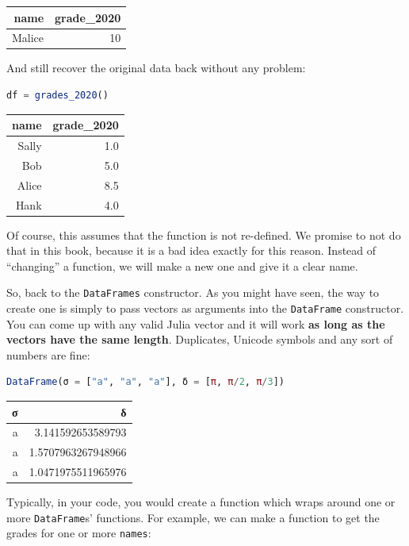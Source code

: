\documentclass[
  notoc %
]{tufte-book}
\newcommand{\passthrough}[1]{#1}
\begin{document}
\begin{longtable}[]{@{}rr@{}}
\toprule()
name & grade\_2020 \\
\midrule()
\endhead
Malice & 10 \\
\bottomrule()
\end{longtable}

And still recover the original data back without any problem:

\begin{lstlisting}[language=Julia]
df = grades_2020()
\end{lstlisting}

\begin{longtable}[]{@{}rr@{}}
\toprule()
name & grade\_2020 \\
\midrule()
\endhead
Sally & 1.0 \\
Bob & 5.0 \\
Alice & 8.5 \\
Hank & 4.0 \\
\bottomrule()
\end{longtable}

Of course, this assumes that the function is not re-defined. We promise
to not do that in this book, because it is a bad idea exactly for this
reason. Instead of ``changing'' a function, we will make a new one and
give it a clear name.

So, back to the \passthrough{\lstinline!DataFrames!} constructor. As you
might have seen, the way to create one is simply to pass vectors as
arguments into the \passthrough{\lstinline!DataFrame!} constructor. You
can come up with any valid Julia vector and it will work \textbf{as long
as the vectors have the same length}. Duplicates, Unicode symbols and
any sort of numbers are fine:

\begin{lstlisting}[language=Julia]
DataFrame(σ = ["a", "a", "a"], δ = [π, π/2, π/3])
\end{lstlisting}

\begin{longtable}[]{@{}rr@{}}
\toprule()
σ & δ \\
\midrule()
\endhead
a & 3.141592653589793 \\
a & 1.5707963267948966 \\
a & 1.0471975511965976 \\
\bottomrule()
\end{longtable}

Typically, in your code, you would create a function which wraps around
one or more \passthrough{\lstinline!DataFrame!}s' functions. For
example, we can make a function to get the grades for one or more
\passthrough{\lstinline!names!}:
\end{document}
